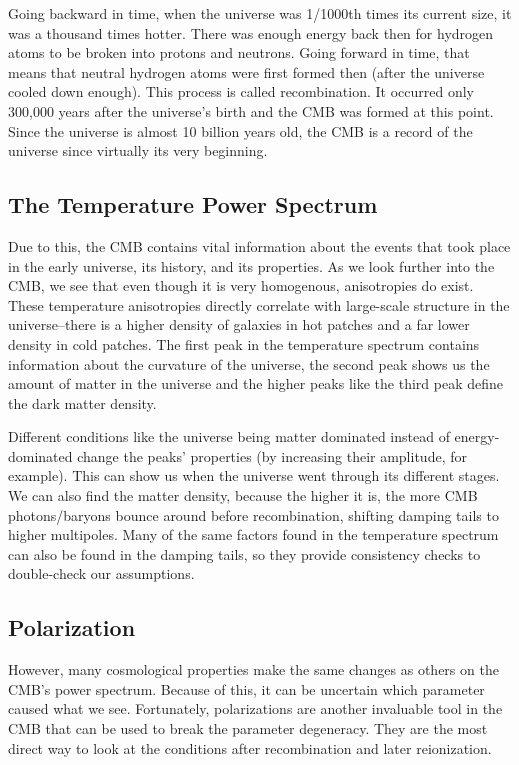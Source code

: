 \documentclass[12pt]{article}
\begin{document}
Going backward in time, when the universe was 1/1000th times its current size, it was a thousand times hotter. There was enough energy back then for hydrogen atoms to be broken into protons and neutrons. Going forward in time, that means that neutral hydrogen atoms were first formed then (after the universe cooled down enough). This process is called recombination. It occurred only 300,000 years after the universe’s birth and the CMB was formed at this point. Since the universe is almost 10 billion years old, the CMB is a record of the universe since virtually its very beginning.

\subsection{The Temperature Power Spectrum}
Due to this, the CMB contains vital information about the events that took place in the early universe, its history, and its properties. As we look further into the CMB, we see that even though it is very homogenous, anisotropies do exist. These temperature anisotropies directly correlate with large-scale structure in the universe–there is a higher density of galaxies in hot patches and a far lower density in cold patches. The first peak in the temperature spectrum contains information about the curvature of the universe, the second peak shows us the amount of matter in the universe and the higher peaks like the third peak define the dark matter density.

Different conditions like the universe being matter dominated instead of energy-dominated change the peaks’ properties (by increasing their amplitude, for example). This can show us when the universe went through its different stages. We can also find the matter density, because the higher it is, the more CMB photons/baryons bounce around before recombination, shifting damping tails to higher multipoles. Many of the same factors found in the temperature spectrum can also be found in the damping tails, so they provide consistency checks to double-check our assumptions.

\subsection{Polarization}
However, many cosmological properties make the same changes as others on the CMB’s power spectrum. Because of this, it can be uncertain which parameter caused what we see. Fortunately, polarizations are another invaluable tool in the CMB that can be used to break the parameter degeneracy. They are the most direct way to look at the conditions after recombination and later reionization.
\end{document}
